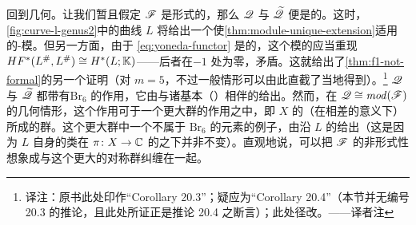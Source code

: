 回到几何。让我们暂且假定 $\mathscr{F}$ 是形式的，那么 $\mathscr{Q}$ 与 $\widetilde{\mathscr{Q}}$ 便是\trQuasiequivalent{}的。这时，\cref{fig:curve-l-genus2}中的曲线 $L$ 将给出一个使\cref{thm:module-unique-extension}适用的\trAinfty-模。但另一方面，由于 \eqref{eq:yoneda-functor} 是\trFaithful{}的，这个模的\trEndomorphism{}应当重现 $HF^*(L^\#,L^\#)\cong H^*(L;\mathbb{K})$——后者在\trDegree{}$-1$ 处为零，矛盾。这就给出了\cref{thm:f1-not-formal}的另一个证明（对 $m=5$，不过一般情形可以由此直截了当地得到）。\footnote{译注：原书此处印作“Corollary 20.3”；疑应为“Corollary 20.4”（本节并无编号 20.3 的推论，且此处所证正是推论 20.4 之断言）；此处径改。——译者注}
$\mathscr{Q}$ 与 $\widetilde{\mathscr{Q}}$ 都带有\trBraidGroup{}$\mathrm{Br}_6$ 的作用，它由与诸基本（\trSphericalObject{}）\trObject{}相伴的\trTwistFunctor{}给出。然而，在 $\mathscr{Q}\cong\mathit{mod}(\mathscr{F})$ 的几何情形，这个作用可\trEmbedding{}于一个更大群的作用之中，即 $X$ 的\trGraded\trExact\trSymplectic\trAutomorphism{}（在相差\trIsotopy{}的意义下）所成的群。这个更大群中一个不属于 $\mathrm{Br}_6$ 的元素的例子，由沿 $L$ 的\trDehnTwist{}给出（这是因为 $L$ 自身的\trIsotopy{}类在 $\pi\colon X\to\mathbb{C}$ 的\trCovering\trInvolution{}之下并非不变）。直观地说，可以把 $\mathscr{F}$ 的非形式性想象成与这个更大的对称群纠缠在一起。
